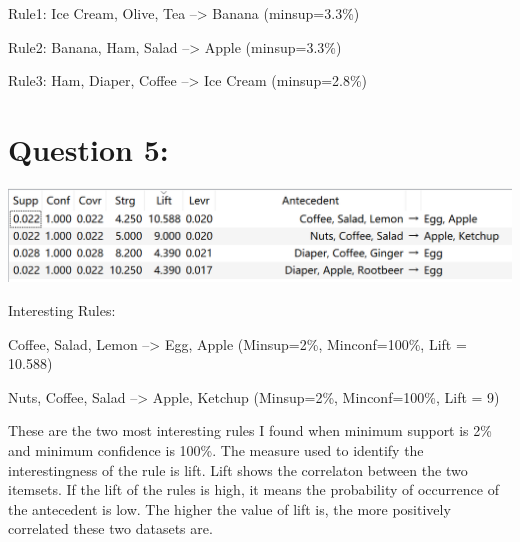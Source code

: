 \documentclass[titlepage]{article}
\begin{document}
Rule1: Ice Cream, Olive, Tea --> Banana (minsup=3.3\%)

Rule2: Banana, Ham, Salad --> Apple (minsup=3.3\%)

Rule3: Ham, Diaper, Coffee --> Ice Cream (minsup=2.8\%)

\section{Question 5:}
\label{sec:org487ddec}
\begin{center}
\begin{center}
\includegraphics[width=.9\linewidth]{interest.png}
\end{center}
\end{center}

Interesting Rules:

Coffee, Salad, Lemon --> Egg, Apple   (Minsup=2\%, Minconf=100\%, Lift = 10.588)

Nuts, Coffee, Salad --> Apple, Ketchup     (Minsup=2\%, Minconf=100\%, Lift = 9)

These are the two most interesting rules I found when minimum support is 2\%
and minimum confidence is 100\%. The measure used to identify the
interestingness of the rule is lift. Lift shows the correlaton between the two
itemsets. If the lift of the rules is high, it means the probability of
occurrence of the antecedent is low. The higher the value of lift is, the more
positively correlated these two datasets are.
\end{document}
